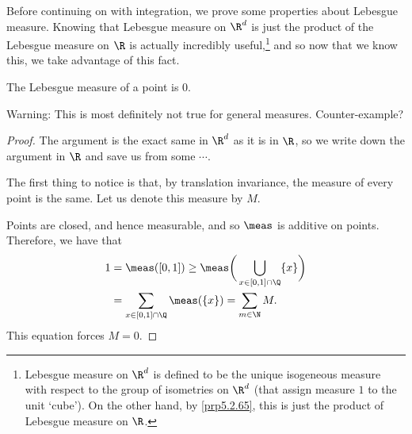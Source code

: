 Before continuing on with integration, we prove some properties about Lebesgue measure.  Knowing that Lebesgue measure on $\R ^d$ is just the product of the Lebesgue measure on $\R$ is actually incredibly useful,\footnote{Lebesgue measure on $\R ^d$ is defined to be the unique isogeneous measure with respect to the group of isometries on $\R ^d$ (that assign measure $1$ to the unit `cube').  On the other hand, by \cref{prp5.2.65}, this is just the product of Lebesgue measure on $\R$.} and so now that we know this, we take advantage of this fact.
\begin{prp}{}{}
The Lebesgue measure of a point is $0$.
\begin{wrn}
Warning:  This is most definitely not true for general measures.  Counter-example?
\end{wrn}
\begin{proof}
The argument is the exact same in $\R ^d$ as it is in $\R$, so we write down the argument in $\R$ and save us from some $\cdots$.

The first thing to notice is that, by translation invariance, the measure of every point is the same.  Let us denote this measure by $M$.

Points are closed, and hence measurable, and so $\meas$ is additive on points.  Therefore, we have that
\begin{equation}
\begin{split}
1 & =\meas ([0,1])\geq \meas \bigg( \bigcup _{x\in [0,1]\cap \Q}\{ x\} \bigg) \\
& =\sum _{x\in [0,1]\cap \Q}\meas (\{ x\} )=\sum _{m\in \N}M.
\end{split}
\end{equation}
This equation forces $M=0$.
\end{proof}
\end{prp}
